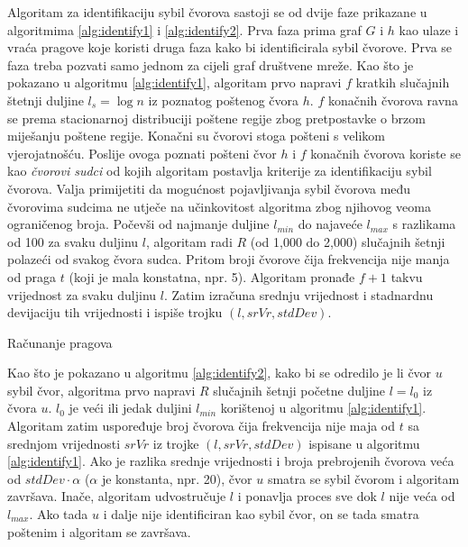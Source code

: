 \documentclass[times, utf8, seminar, numeric]{fer}
\begin{document}
Algoritam za identifikaciju sybil čvorova sastoji se od dvije faze prikazane u algoritmima \ref{alg:identify1} i \ref{alg:identify2}. Prva faza prima graf $G$ i $h$ kao ulaze i vraća pragove koje koristi druga faza kako bi identificirala sybil čvorove. Prva se faza treba pozvati samo jednom za cijeli graf društvene mreže. Kao što je pokazano u algoritmu \ref{alg:identify1}, algoritam prvo napravi $f$ kratkih slučajnih štetnji duljine $l_s = \log n$ iz poznatog poštenog čvora $h$. $f$ konačnih čvorova ravna se prema stacionarnoj distribuciji poštene regije zbog pretpostavke o brzom miješanju poštene regije. Konačni su čvorovi stoga pošteni s velikom vjerojatnošću. \cite{sybil-guard} Poslije ovoga poznati pošteni čvor $h$ i $f$ konačnih čvorova koriste se kao \textit{čvorovi sudci} od kojih algoritam postavlja kriterije za identifikaciju sybil čvorova. Valja primijetiti da mogućnost pojavljivanja sybil čvorova među čvorovima sudcima ne utječe na učinkovitost algoritma zbog njihovog veoma ograničenog broja. Počevši od najmanje duljine $l_{min}$ do najaveće $l_{max}$ s razlikama od 100 za svaku duljinu $l$, algoritam radi $R$ (od 1,000 do 2,000) slučajnih šetnji polazeći od svakog čvora sudca. Pritom broji čvorove čija frekvencija nije manja od praga $t$ (koji je mala konstatna, npr. 5). Algoritam pronađe $f + 1$ takvu vrijednost za svaku duljinu $l$. Zatim izračuna srednju vrijednost i stadnardnu devijaciju tih vrijednosti i ispiše trojku $(l, srVr, stdDev)$.

\begin{algorithm}[h]
	\caption{Računanje pragova}
	\label{alg:identify1}


\end{algorithm}

Kao što je pokazano u algoritmu \ref{alg:identify2}, kako bi se odredilo je li čvor $u$ sybil čvor, algoritma prvo napravi $R$ slučajnih šetnji početne duljine $l = l_0$ iz čvora $u$. $l_0$ je veći ili jedak duljini $l_{min}$ korištenoj u algoritmu \ref{alg:identify1}. Algoritam zatim uspoređuje broj čvorova čija frekvencija nije maja od $t$ sa srednjom vrijednosti $srVr$ iz trojke $(l, srVr, stdDev)$ ispisane u algoritmu \ref{alg:identify1}. Ako je razlika srednje vrijednosti i broja prebrojenih čvorova veća od $stdDev \cdot \alpha$ ($\alpha$ je konstanta, npr. 20), čvor $u$ smatra se sybil čvorom i algoritam završava. Inače, algoritam udvostručuje $l$ i ponavlja proces sve dok $l$ nije veća od $l_{max}$. Ako tada $u$ i dalje nije identificiran kao sybil čvor, on se tada smatra poštenim i algoritam se završava.
\end{document}
